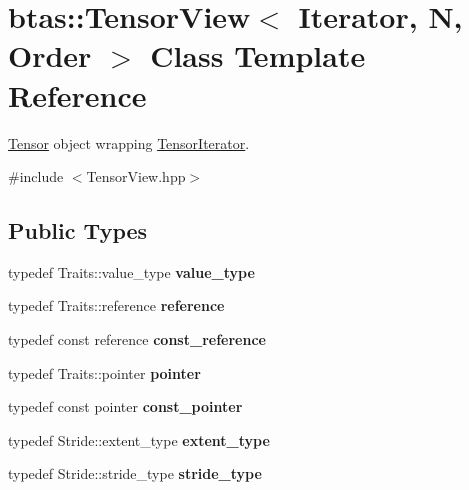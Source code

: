 \hypertarget{classbtas_1_1_tensor_view}{
\section{btas::TensorView$<$ Iterator, N, Order $>$ Class Template Reference}
\label{classbtas_1_1_tensor_view}
}


\hyperlink{classbtas_1_1_tensor}{Tensor} object wrapping \hyperlink{classbtas_1_1_tensor_iterator}{TensorIterator}.  


{\ttfamily \#include $<$TensorView.hpp$>$}\subsection*{Public Types}
\begin{DoxyCompactItemize}
\item 
\hypertarget{classbtas_1_1_tensor_view_a1ab6cf801fd6630da4aa6f4b4660bcd6}{
typedef Traits::value\_\-type {\bfseries value\_\-type}}
\label{classbtas_1_1_tensor_view_a1ab6cf801fd6630da4aa6f4b4660bcd6}

\item 
\hypertarget{classbtas_1_1_tensor_view_a8fc5ce18eacb5c18c347a4e063bcb4b2}{
typedef Traits::reference {\bfseries reference}}
\label{classbtas_1_1_tensor_view_a8fc5ce18eacb5c18c347a4e063bcb4b2}

\item 
\hypertarget{classbtas_1_1_tensor_view_aa72ae78ae369423bd9e46d1d5df53e6a}{
typedef const reference {\bfseries const\_\-reference}}
\label{classbtas_1_1_tensor_view_aa72ae78ae369423bd9e46d1d5df53e6a}

\item 
\hypertarget{classbtas_1_1_tensor_view_a26e5f5a77d6680f4cfd90a240894ee0c}{
typedef Traits::pointer {\bfseries pointer}}
\label{classbtas_1_1_tensor_view_a26e5f5a77d6680f4cfd90a240894ee0c}

\item 
\hypertarget{classbtas_1_1_tensor_view_a6772cb985fe3c835dd55e6d91ce31c00}{
typedef const pointer {\bfseries const\_\-pointer}}
\label{classbtas_1_1_tensor_view_a6772cb985fe3c835dd55e6d91ce31c00}

\item 
\hypertarget{classbtas_1_1_tensor_view_a57682003c9a6667aa5e6971548675857}{
typedef Stride::extent\_\-type {\bfseries extent\_\-type}}
\label{classbtas_1_1_tensor_view_a57682003c9a6667aa5e6971548675857}

\item 
\hypertarget{classbtas_1_1_tensor_view_a51913c89c2d4ff43e7115f9faea34b53}{
typedef Stride::stride\_\-type {\bfseries stride\_\-type}}
\label{classbtas_1_1_tensor_view_a51913c89c2d4ff43e7115f9faea34b53}


\end{DoxyCompactItemize}
